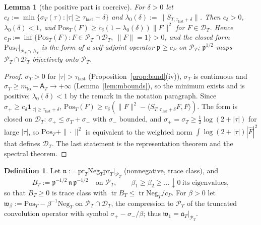 \documentclass[11pt]{amsart}
\newtheorem{lemma}[theorem]{Lemma}
\theoremstyle{definition}
\newtheorem{definition}[theorem]{Definition}
\theoremstyle{remark}
\newcommand{\PT}{\mathcal P_T}
\newcommand{\sT}{\sigma_T}
\newcommand{\Fh}{\widehat F}
\newcommand{\Aconst}{\mathsf A_T}
\begin{document}
\begin{lemma}[the positive part is coercive]\label{lem:wh-cP}
For $\delta>0$ let $c_\delta:=\min\{\sT(\tau):|\tau|\ge\tau_{\mathrm{last}}+\delta\}$ and
$\lambda_0(\delta):=\|S_{T,\tau_{\mathrm{last}}+\delta}\|$. Then $c_\delta>0$, $\lambda_0(\delta)<1$, and
$\mathrm{Pos}_T(F)\ge c_\delta(1-\lambda_0(\delta))\|F\|^2$ for $F\in\mathcal D_T$. Hence
$c_P:=\inf\{\mathrm{Pos}_T(F):F\in\PT\cap\mathcal D_T,\ \|F\|=1\}>0$, and the closed form $\mathrm{Pos}_T|_{\PT\cap\mathcal D_T}$
is the form of a self-adjoint operator $\mathfrak p\ge c_P$ on $\PT$; $\mathfrak p^{1/2}$ maps $\PT\cap\mathcal D_T$
bijectively onto $\PT$.
\end{lemma}

\begin{proof}
$\sT>0$ for $|\tau|>\tau_{\mathrm{last}}$ (Proposition~\ref{prop:band}(iv)), $\sT$ is continuous and
$\sT\ge m_{\mathrm{lo}}-\Aconst\to+\infty$ (Lemma~\ref{lem:mbounds}), so the minimum exists and is positive;
$\lambda_0(\delta)<1$ by the remark in the notation paragraph. Since
$\sigma_+\ge c_\delta\mathbf 1_{|\tau|\ge\tau_{\mathrm{last}}+\delta}$,
$\mathrm{Pos}_T(F)\ge c_\delta(\|F\|^2-\langle S_{T,\tau_{\mathrm{last}}+\delta}F,F\rangle)$. The form is closed on
$\mathcal D_T$: $\sigma_+\le\sT+\sigma_-$ with $\sigma_-$ bounded, and $\sigma_+=\sT\ge\frac12\log(2+|\tau|)$ for large
$|\tau|$, so $\mathrm{Pos}_T+\|\cdot\|^2$ is equivalent to the weighted norm $\int\log(2+|\tau|)|\Fh|^2$ that defines
$\mathcal D_T$. The last statement is the representation theorem and the spectral theorem.
\end{proof}

\begin{definition}\label{def:wh-B}
Let $\mathfrak n:=\mathrm{pr}_T\mathrm{Neg}_T\mathrm{pr}_T|_{\PT}$ (nonnegative, trace class), and
\[
B_T:=\mathfrak p^{-1/2}\,\mathfrak n\,\mathfrak p^{-1/2}\quad\text{on }\PT,\qquad
\beta_1\ge\beta_2\ge\dots\downarrow0\ \text{its eigenvalues},
\]
so that $B_T\ge0$ is trace class with $\operatorname{tr}B_T\le\operatorname{tr}\mathrm{Neg}_T/c_P$. For $\beta>0$ let
$\mathfrak w_\beta:=\mathrm{Pos}_T-\beta^{-1}\mathrm{Neg}_T$ on $\PT\cap\mathcal D_T$, the compression to $\PT$ of the
truncated convolution operator with symbol $\sigma_+-\sigma_-/\beta$; thus $\mathfrak w_1=\mathfrak a_T|_{\PT}$.
\end{definition}
\end{document}
